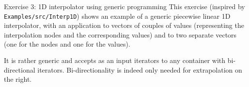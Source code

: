 \documentclass[10pt,aspectratio=169]{beamer}
\begin{document}
\begin{frame}{Exercise 3: 1D interpolator using generic programming}
This exercise (inspired by \texttt{Examples/src/Interp1D}) shows an example of a generic piecewise linear 1D interpolator, with an application to
vectors of couples of values (representing the interpolation nodes and the corresponding values) and to two separate vectors (one for the nodes and one for the values).

It is rather generic and accepts as an input iterators to any container with bi-directional iterators. Bi-directionality is indeed only needed for extrapolation on the right.
\end{frame}
\end{document}
